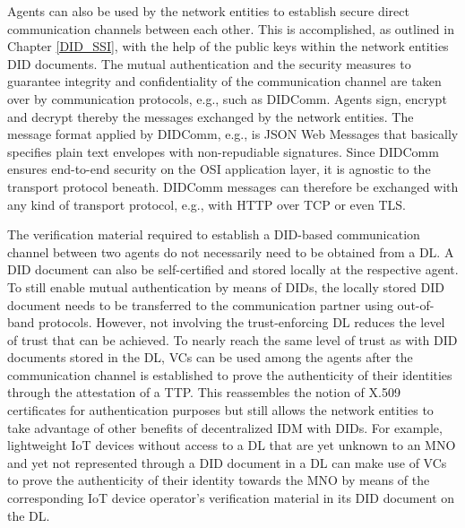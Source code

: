 \documentclass[conference]{IEEEtran}
\begin{document}
Agents can also be used by the network entities to establish secure direct communication channels between each other. This is accomplished, as outlined in Chapter \ref{DID_SSI}, with the help of the public keys within the network entities DID documents. The mutual authentication and the security measures to guarantee integrity and confidentiality of the communication channel are taken over by communication protocols, e.g., such as DIDComm. Agents sign, encrypt and decrypt thereby the messages exchanged by the network entities. The message format applied by DIDComm, e.g., is JSON Web Messages that basically specifies plain text envelopes with non-repudiable signatures. Since DIDComm ensures end-to-end security on the OSI application layer, it is agnostic to the transport protocol beneath. DIDComm messages can therefore be exchanged with any kind of transport protocol, e.g., with HTTP over TCP or even TLS. %

The verification material required to establish a DID-based communication channel between two agents do not necessarily need to be obtained from a DL. A DID document can also be self-certified and stored locally at the respective agent. To still enable mutual authentication by means of DIDs, the locally stored DID document needs to be transferred to the communication partner using out-of-band protocols. However, not involving the trust-enforcing DL reduces the level of trust that can be achieved. To nearly reach the same level of trust as with DID documents stored in the DL, VCs can be used among the agents after the communication channel is established to prove the authenticity of their identities through the attestation of a TTP. This reassembles the notion of X.509 certificates for authentication purposes but still allows the network entities to take advantage of other benefits of decentralized IDM with DIDs. For example, lightweight IoT devices without access to a DL that are yet unknown to an MNO and yet not represented through a DID document in a DL can make use of VCs to prove the authenticity of their identity towards the MNO by means of the corresponding IoT device operator's verification material in its DID document on the DL.   


\end{document}
